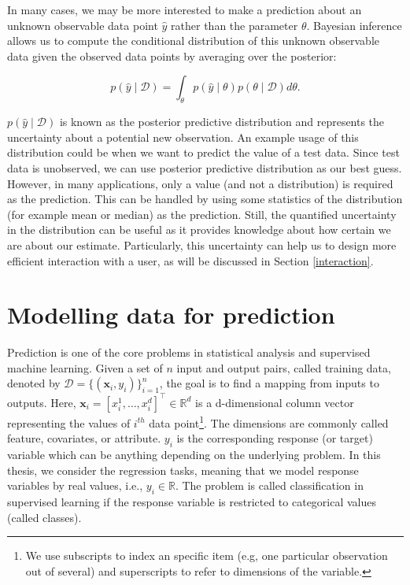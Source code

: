 \documentclass[dissertation,math,vertlayout,pdfa,colorlinks]{aaltoseries}
\newcommand{\bD}{\mathcal{D}}
\newcommand{\tp}{^{\top}}
\begin{document}
In many cases, we may be more interested to make a prediction about an unknown observable data point $\hat{y}$ rather than the parameter $\theta$. Bayesian inference allows us to compute the conditional distribution of this unknown observable data given the observed data points by averaging over the posterior: 

\begin{equation}
p(\hat{y} \mid\bD ) = \int_{\theta} p(\hat{y}  \mid \theta)p(\theta \mid \bD)d\theta. 
\end{equation}

$p(\hat{y} \mid \bD)$ is known as the posterior predictive distribution and represents the uncertainty about a potential new observation. An example usage of this distribution could be when we want to predict the value of a test data. Since test data is unobserved, we can use posterior predictive distribution as our best guess. However, in many applications, only a value (and not a distribution) is required as the prediction. This can be handled by using some statistics of the distribution (for example mean or median) as the prediction. Still, the quantified uncertainty in the distribution can be useful as it provides knowledge about how certain we are about our estimate. Particularly, this uncertainty can help us to design more efficient interaction with a user, as will be discussed in Section \ref{interaction}.

	


\section{Modelling data for prediction} \label{prob_model_data}

Prediction is one of the core problems in statistical analysis and supervised machine learning. Given a set of $n$ input and output pairs, called training data, denoted by $\bD= \{(\bm{x}_i,y_i)\}_{i=1}^{n}$, the goal is to find a mapping from inputs to outputs. Here, $\bm{x}_i = [x_i^1,\ldots,x_i^d]\tp \in \mathbb{R}^d$ is a d-dimensional column vector representing the values of $i^{th}$ data point\footnote{We use subscripts to index an specific item (e.g, one particular observation out of several) and superscripts to refer to dimensions of the variable.}. The dimensions are commonly called feature, covariates, or attribute. $y_i$ is the corresponding response (or target) variable which can be anything depending on the underlying problem. In this thesis, we consider the regression tasks, meaning that we model response variables by real values, i.e., $y_i \in \mathbb{R}$. The problem is called classification in supervised learning if the response variable is restricted to categorical values (called classes). 
\end{document}
